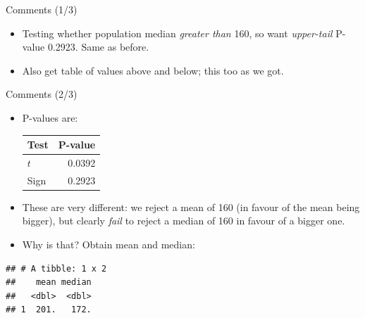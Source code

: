 \documentclass[
  ignorenonframetext,
]{beamer}
\newenvironment{Shaded}{\begin{snugshade}}{\end{snugshade}}
\newcommand{\DataTypeTok}[1]{\textcolor[rgb]{0.13,0.29,0.53}{#1}}
\newcommand{\KeywordTok}[1]{\textcolor[rgb]{0.13,0.29,0.53}{\textbf{#1}}}
\newcommand{\NormalTok}[1]{#1}
\newcommand{\OperatorTok}[1]{\textcolor[rgb]{0.81,0.36,0.00}{\textbf{#1}}}
\newcommand{\StringTok}[1]{\textcolor[rgb]{0.31,0.60,0.02}{#1}}
\providecommand{\tightlist}{%
  \setlength{\itemsep}{0pt}\setlength{\parskip}{0pt}}
\begin{document}
\begin{frame}{Comments (1/3)}
\protect\hypertarget{comments-13}{}

\begin{itemize}
\tightlist
\item
  Testing whether population median \emph{greater than} 160, so want
  \emph{upper-tail} P-value 0.2923. Same as before.
\item
  Also get table of values above and below; this too as we got.
\end{itemize}

\end{frame}

\begin{frame}[fragile]{Comments (2/3)}
\protect\hypertarget{comments-23}{}

\begin{itemize}
\tightlist
\item
  P-values are:

  \begin{center}
    \begin{tabular}{lr}
      Test & P-value\\
      \hline
      $t$ & 0.0392\\
      Sign & 0.2923\\
      \hline
    \end{tabular}

    \end{center}
\item
  These are very different: we reject a mean of 160 (in favour of the
  mean being bigger), but clearly \emph{fail} to reject a median of 160
  in favour of a bigger one.
\item
  Why is that? Obtain mean and median:
\end{itemize}

\begin{Shaded}
\end{Shaded}

\begin{verbatim}
## # A tibble: 1 x 2
##    mean median
##   <dbl>  <dbl>
## 1  201.   172.
\end{verbatim}

\end{frame}
\end{document}
